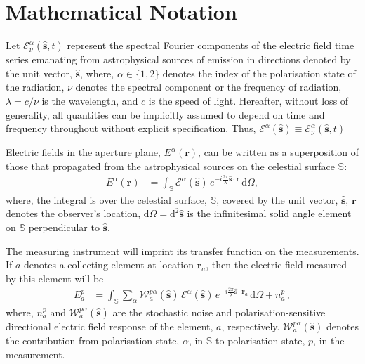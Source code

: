 \documentclass[
  journal=pasa,
  manuscript=article-type,
  year=2020,
  volume=37,
]{cup-journal}
\begin{document}
\section{Mathematical Notation}\label{sec:notation}

Let $\mathcal{E}^\alpha_\nu(\hat{\boldsymbol{s}},t)$ represent the spectral Fourier components of the electric field time series emanating from astrophysical sources of emission in directions denoted by the unit vector, $\hat{\boldsymbol{s}}$, where, $\alpha\in\{1,2\}$ denotes the index of the polarisation state of the radiation, $\nu$ denotes the spectral component or the frequency of radiation, $\lambda=c/\nu$ is the wavelength, and $c$ is the speed of light. Hereafter, without loss of generality, all quantities can be implicitly assumed to depend on time and frequency throughout without explicit specification. Thus, $\mathcal{E}^\alpha(\hat{\boldsymbol{s}})\equiv \mathcal{E}^\alpha_\nu(\hat{\boldsymbol{s}},t)$

Electric fields in the aperture plane, $E^\alpha(\boldsymbol{r})$, can be written as a superposition of those that propagated from the astrophysical sources on the celestial surface $\mathbb{S}$:
\begin{align}
    E^\alpha(\boldsymbol{r}) &= \int_\mathbb{S} \mathcal{E}^\alpha(\hat{\boldsymbol{s}})\, e^{-i \frac{2\pi}{\lambda}\hat{\boldsymbol{s}}\cdot\boldsymbol{r}} \,\mathrm{d}\Omega,
\end{align}
where, the integral is over the celestial surface, $\mathbb{S}$, covered by the unit vector, $\hat{\boldsymbol{s}}$, $\boldsymbol{r}$ denotes the observer's location, $\mathrm{d}\Omega=\mathrm{d}^2\hat{\boldsymbol{s}}$ is the infinitesimal solid angle element on $\mathbb{S}$ perpendicular to $\hat{\boldsymbol{s}}$. 

The measuring instrument will imprint its transfer function on the measurements. If $a$ denotes a collecting element at location $\boldsymbol{r}_{a}$, then the electric field measured by this element will be
\begin{align}
    E_{a}^p &= \int_\mathbb{S} \sum_\alpha  \mathcal{W}_{a}^{p\alpha}(\hat{\boldsymbol{s}})\, \mathcal{E}^\alpha(\hat{\boldsymbol{s}})\, e^{-i \frac{2\pi}{\lambda} \hat{\boldsymbol{s}}\cdot\boldsymbol{r}_{a}} \,\mathrm{d}\Omega + n_{a}^p \, , \label{eqn:polarimetric-Efield-element-ideal}
\end{align}
where, $n_{a}^p$ and $\mathcal{W}_{a}^{p\alpha}(\hat{\boldsymbol{s}})$ are the stochastic noise and polarisation-sensitive directional electric field response of the element, $a$, respectively. $\mathcal{W}_{a}^{p\alpha}(\hat{\boldsymbol{s}})$ denotes the contribution from polarisation state, $\alpha$, in $\mathbb{S}$ to polarisation state, $p$, in the measurement.
\end{document}
